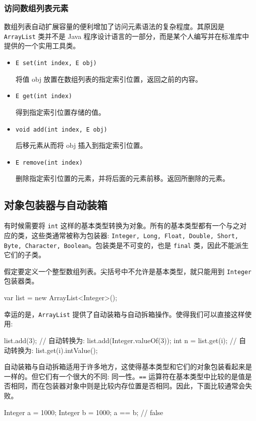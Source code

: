 \subsubsection{访问数组列表元素}

数组列表自动扩展容量的便利增加了访问元素语法的复杂程度。其原因是 \texttt{ArrayList} 类并不是 Java 程序设计语言的一部分，而是某个人编写并在标准库中提供的一个实用工具类。
\begin{itemize}
    \item \texttt{E set(int index, E obj)}
    
    将值 obj 放置在数组列表的指定索引位置，返回之前的内容。
    \item \texttt{E get(int index)}
    
    得到指定索引位置存储的值。
    \item \texttt{void add(int index, E obj)}
    
    后移元素从而将 obj 插入到指定索引位置。
    \item \texttt{E remove(int index)}
    
    删除指定索引位置的元素，并将后面的元素前移。返回所删除的元素。
\end{itemize}

\subsection{对象包装器与自动装箱}

有时候需要将 \texttt{int} 这样的基本类型转换为对象。所有的基本类型都有一个与之对应的类，这些类通常被称为包装器: \texttt{Integer, Long, Float, Double, Short, Byte, Character, Boolean}。包装类是不可变的，也是 \texttt{final} 类，因此不能派生它们的子类。

假定要定义一个整型数组列表。尖括号中不允许是基本类型，就只能用到 \texttt{Integer} 包装器类。
\begin{Java}
var list = new ArrayList<Integer>();
\end{Java}

幸运的是，\texttt{ArrayList} 提供了自动装箱与自动拆箱操作。使得我们可以直接这样使用:
\begin{Java}
list.add(3);            // 自动转换为: list.add(Integer.valueOf(3));
int n = list.get(i);    // 自动转换为: list.get(i).intValue();
\end{Java}

自动装箱与自动拆箱适用于许多地方，这使得基本类型和它们的对象包装看起来是一样的。但它们有一个很大的不同: 同一性。\texttt{==} 运算符在基本类型中比较的是值是否相同，而在包装器对象中则是比较内存位置是否相同。因此，下面比较通常会失败。
\begin{Java}
Integer a = 1000;
Integer b = 1000;
a == b;     // false
\end{Java}

